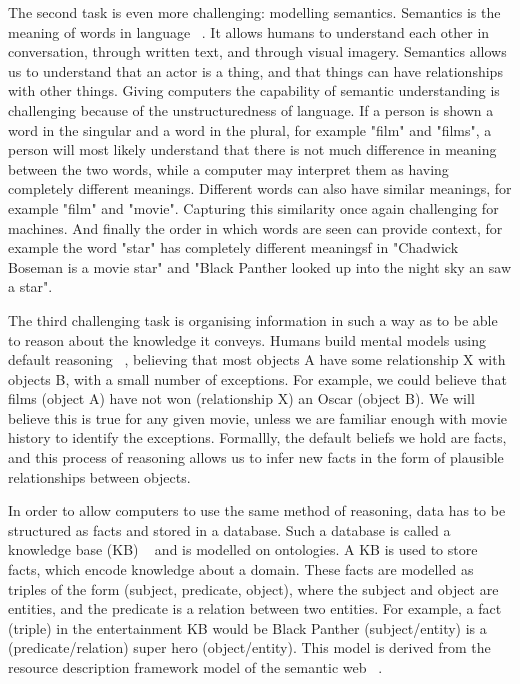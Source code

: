 \noindent The second task is even more challenging: modelling semantics. Semantics is the meaning of words in language \unskip~\citep{chomsky1955logical}. It allows humans to understand each other in conversation, through written text, and through visual imagery. Semantics allows us to understand that an actor is a thing, and that things can have relationships with other things. Giving computers the capability of semantic understanding is challenging because of the unstructuredness of language. If a person is shown a word in the singular and a word in the plural, for example "film" and "films", a person will most likely understand that there is not much difference in meaning between the two words, while a computer may interpret them as having completely different meanings. Different words can also have similar meanings, for example "film" and "movie". Capturing this similarity once again challenging for machines. And finally the order in which words are seen can provide context, for example the word "star" has completely different meaningsf in "Chadwick Boseman is a movie star" and "Black Panther looked up into the night sky an saw a star". \par

\noindent The third challenging task is organising information in such a way as to be able to reason about the knowledge it conveys. Humans build mental models using default reasoning \unskip~\citep{reiter1980logic}, believing that most objects A have some relationship X with objects B, with a small number of exceptions. For example, we could believe that films (object A) have not won (relationship X) an Oscar (object B). We will believe this is true for any given movie, unless we are familiar enough with movie history to identify the exceptions. Formallly, the default beliefs we hold are facts, and this process of reasoning allows us to infer new facts in the form of plausible relationships between objects. \par

\noindent In order to allow computers to use the same method of reasoning, data has to be structured as facts and stored in a database. Such a database is called a knowledge base (KB) \unskip~\citep{carlson2010toward, angeli2013philosophers}  and is modelled on ontologies. A KB is used to store facts, which encode knowledge about a domain. These facts are modelled as triples of the form (subject, predicate, object), where the subject and object are entities, and the predicate is a relation between two entities. For example, a fact (triple) in the entertainment KB would be Black Panther (subject/entity) is a (predicate/relation) super hero (object/entity). This model is derived from the resource description framework model of the semantic web \unskip~\citep{bizer2009dbpedia}. \par

